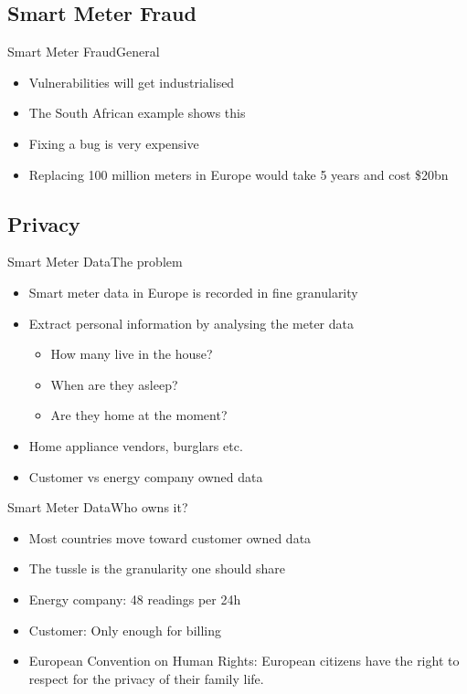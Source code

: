 \documentclass[10pt]{beamer}
\begin{document}
\subsection{Smart Meter Fraud}
\begin{frame}{Smart Meter Fraud}{General}
	\begin{itemize}
		\item Vulnerabilities will get industrialised
		\item The South African example shows this 
		\item Fixing a bug is very expensive
		\item Replacing 100 million meters in Europe would take 5 years and cost \$20bn
	\end{itemize}
\end{frame}

\subsection{Privacy}
\begin{frame}{Smart Meter Data}{The problem}
	\begin{itemize}
		\item Smart meter data in Europe is recorded in fine granularity
		\item Extract personal information by analysing the meter data
		\begin{itemize}
			\item How many live in the house?
			\item When are they asleep?
			\item Are they home at the moment?
		\end{itemize}
		\item Home appliance vendors, burglars etc.
		\item Customer vs energy company owned data
	\end{itemize}
\end{frame}


\begin{frame}{Smart Meter Data}{Who owns it?}
	\begin{itemize}
		\item Most countries move toward customer owned data
		\item The tussle is the granularity one should share
		\item Energy company: 48 readings per 24h
		\item Customer: Only enough for billing
		\item European Convention on Human Rights: European citizens have the right to respect for the privacy	of their family life.
	\end{itemize}
\end{frame}
\end{document}

